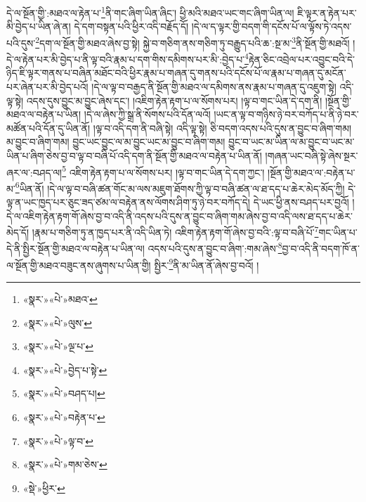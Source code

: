 དེ་ལ་སྔོན་གྱི་:མཐའ་ལ་རྟེན་པ་\footnote{«སྣར་»«པེ་»མཐའ་}ནི་གང་ཞིག་ཡིན་ཞིང་། ཕྱི་མའི་མཐའ་ཡང་གང་ཞིག་ཡིན་ལ། ཇི་ལྟར་ན་རྟེན་པར་མི་བྱེད་པ་ཡིན་ཞེ་ན། དེ་དག་བསྟན་པའི་ཕྱིར་འདི་བརྗོད་དོ། །དེ་ལ་ད་ལྟར་གྱི་བདག་གི་དངོས་པོ་ལ་ལྟོས་ཏེ་འདས་པའི་དུས་\footnote{«སྣར་»«པེ་»ལུས་}དག་ལ་སྔོན་གྱི་མཐའ་ཞེས་བྱ་སྟེ། སྐྱེ་བ་གཅིག་ནས་གཅིག་ཏུ་བརྒྱུད་པའི་ཆ་:སྔ་མ་\footnote{«སྣར་»«པེ་»ལྔ་པ་}ནི་སྔོན་གྱི་མཐའོ། །དེ་ལ་རྟེན་པར་མི་བྱེད་པ་ནི་ལྟ་བའི་རྣམ་པ་དག་གིས་དམིགས་པར་མི་:བྱེད་པ་\footnote{«སྣར་»«པེ་»བྱེད་པ་སྟེ་}རྟེན་ཅིང་འབྲེལ་པར་འབྱུང་བའི་དེ་ཉིད་ཇི་ལྟར་གནས་པ་བཞིན་མཐོང་བའི་ཕྱིར་རྣམ་པ་གཞན་དུ་གནས་པའི་དངོས་པོ་ལ་རྣམ་པ་གཞན་དུ་མངོན་པར་ཞེན་པར་མི་བྱེད་པའོ། །དེ་ལ་ལྟ་བ་བརྒྱད་ནི་སྔོན་གྱི་མཐའ་ལ་དམིགས་ནས་རྣམ་པ་གཞན་དུ་འཇུག་སྟེ། འདི་ལྟ་སྟེ། འདས་དུས་བྱུང་མ་བྱུང་ཞེས་དང་། །འཇིག་རྟེན་རྟག་པ་ལ་སོགས་པར། །ལྟ་བ་གང་ཡིན་དེ་དག་ནི། །སྔོན་གྱི་མཐའ་ལ་བརྟེན་པ་ཡིན། །དེ་ལ་ཞེས་ཀྱི་སྒྲ་ནི་སོགས་པའི་དོན་ལའོ། །ཡང་ན་ལྟ་བ་གཉིས་ཉེ་བར་བཀོད་པ་ནི་ཉེ་བར་མཚོན་པའི་དོན་དུ་ཡིན་ནོ། །ལྟ་བ་འདི་དག་ནི་བཞི་སྟེ། འདི་ལྟ་སྟེ། ཅི་བདག་འདས་པའི་དུས་ན་བྱུང་བ་ཞིག་གམ། མ་བྱུང་བ་ཞིག་གམ། བྱུང་ཡང་བྱུང་ལ་མ་བྱུང་ཡང་མ་བྱུང་བ་ཞིག་གམ། བྱུང་བ་ཡང་མ་ཡིན་ལ་མ་བྱུང་བ་ཡང་མ་ཡིན་པ་ཞིག་ཅེས་བྱ་བ་ལྟ་བ་བཞི་པོ་འདི་དག་ནི་སྔོན་གྱི་མཐའ་ལ་བརྟེན་པ་ཡིན་ནོ། །གཞན་ཡང་བཞི་སྟེ་ཞེས་སྔར་ཞར་ལ་:བཤད་ལ།\footnote{«སྣར་»«པེ་»བཤད་པ།} འཇིག་རྟེན་རྟག་པ་ལ་སོགས་པར། །ལྟ་བ་གང་ཡིན་དེ་དག་ཀྱང་། །སྔོན་གྱི་མཐའ་ལ་:བརྟེན་པ་མ་\footnote{«སྣར་»«པེ་»བརྟེན་པ་}ཡིན་ནོ། །དེ་ལ་ལྟ་བ་བཞི་ཚན་གོང་མ་ལས་མཇུག་ཐོགས་ཀྱི་ལྟ་བ་བཞི་ཚན་ལ་ཐ་དད་པ་ཆེར་མེད་མོད་ཀྱི། དེ་ལྟ་ན་ཡང་ཁྱད་པར་ཅུང་ཟད་ཙམ་ལ་བརྟེན་ནས་ལོགས་ཤིག་ཏུ་ཉེ་བར་བཀོད་དེ། དེ་ཡང་ཕྱི་ནས་བཤད་པར་བྱའོ། །དེ་ལ་འཇིག་རྟེན་རྟག་གོ་ཞེས་བྱ་བ་འདི་ནི་འདས་པའི་དུས་ན་བྱུང་བ་ཞིག་གམ་ཞེས་བྱ་བ་འདི་ལས་ཐ་དད་པ་ཆེར་མེད་དོ། །རྣམ་པ་གཅིག་ཏུ་ན་ཁྱད་པར་ནི་འདི་ཡིན་ཏེ། འཇིག་རྟེན་རྟག་གོ་ཞེས་བྱ་བའི་:ལྟ་བ་བཞི་པོ་\footnote{«སྣར་»«པེ་»ལྟ་བ་}གང་ཡིན་པ་དེ་ནི་སྤྱིར་སྔོན་གྱི་མཐའ་ལ་བརྟེན་པ་ཡིན་ལ། འདས་པའི་དུས་ན་བྱུང་བ་ཞིག་:གམ་ཞེས་\footnote{«སྣར་»«པེ་»གམ་ཅེས་}བྱ་བ་འདི་ནི་བདག་ཁོ་ན་ལ་སྔོན་གྱི་མཐའ་བཟུང་ནས་ཞུགས་པ་ཡིན་གྱི། སྤྱིར་\footnote{«སྡེ་»ཕྱིར་}ནི་མ་ཡིན་ནོ་ཞེས་བྱ་བའོ། །
